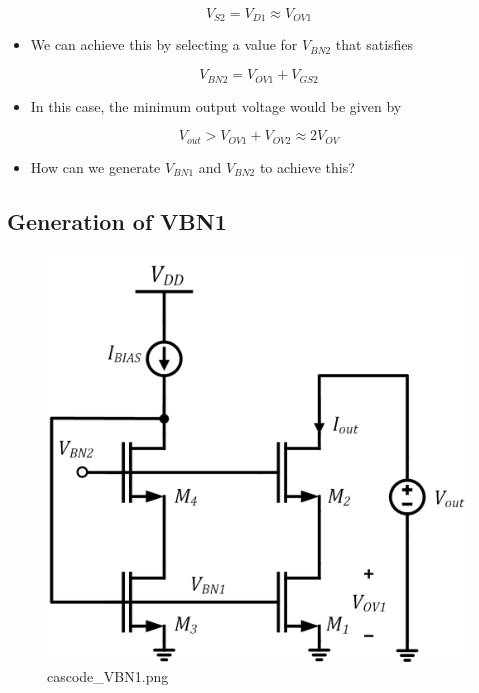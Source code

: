 \documentclass[11pt]{article}
\providecommand{\tightlist}{%
      \setlength{\itemsep}{0pt}\setlength{\parskip}{0pt}}
\begin{document}
\begin{equation}
V_{S2} = V_{D1} \approx V_{OV1}
\end{equation}

\begin{itemize}
\tightlist
\item
  We can achieve this by selecting a value for \(V_{BN2}\) that
  satisfies
\end{itemize}

\begin{equation}
V_{BN2} = V_{OV1} + V_{GS2}
\end{equation}

\begin{itemize}
\tightlist
\item
  In this case, the minimum output voltage would be given by
\end{itemize}

\begin{equation}
V_{out} > V_{OV1} + V_{OV2} \approx 2V_{OV}
\end{equation}

\begin{itemize}
\tightlist
\item
  How can we generate \(V_{BN1}\) and \(V_{BN2}\) to achieve this?
\end{itemize}

    \hypertarget{generation-of-vbn1}{%
\subsection{Generation of VBN1}\label{generation-of-vbn1}}

    \begin{figure}
\centering
\includegraphics{cascode_VBN1.png}
\caption{cascode\_VBN1.png}
\end{figure}
\end{document}

